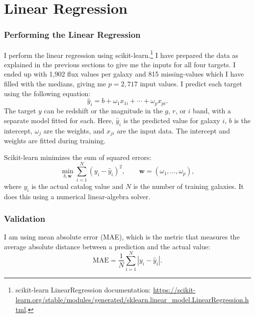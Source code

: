 \documentclass[12pt,a4paper]{article}
\begin{document}
\clearpage
\section{Linear Regression}

\subsubsection{Performing the Linear Regression}

I perform the linear regression using scikit-learn.\footnote{\raggedright scikit-learn LinearRegression documentation: \url{https://scikit-learn.org/stable/modules/generated/sklearn.linear_model.LinearRegression.html}.} I have prepared the data as explained in the previous sections to give me the inputs for all four targets. I ended up with 1,902 flux values per galaxy and 815 missing-values which I have filled with the medians, giving me $p=2,717$ input values. I predict each target using the following equation:
\begin{equation}
    \hat y_i = b + \omega_1 x_{1i} + \cdots + \omega_p x_{pi}.
\end{equation}
The target $y$ can be redshift or the magnitude in the $g$, $r$, or $i$ band, with a separate model fitted for each. Here, $\hat y_i$ is the predicted value for galaxy $i$, $b$ is the intercept, $\omega_j$ are the weights, and $x_{ji}$ are the input data. The intercept and weights are fitted during training.

Scikit-learn minimizes the sum of squared errors:
\begin{equation}
    \min_{b,\mathbf w}\sum_{i=1}^{N}(y_i-\hat y_i)^2,
    \qquad \mathbf w=(\omega_1,\ldots,\omega_p),
\end{equation}
where $y_i$ is the actual catalog value and $N$ is the number of training galaxies. It does this using a numerical linear-algebra solver.

\subsubsection{Validation}

I am using mean absolute error (MAE), which is the metric that measures the average absolute distance between a prediction and the actual value:
\begin{equation}
    \mathrm{MAE}=\frac{1}{N}\sum_{i=1}^{N}|y_i-\hat y_i|.
\end{equation}
\end{document}
